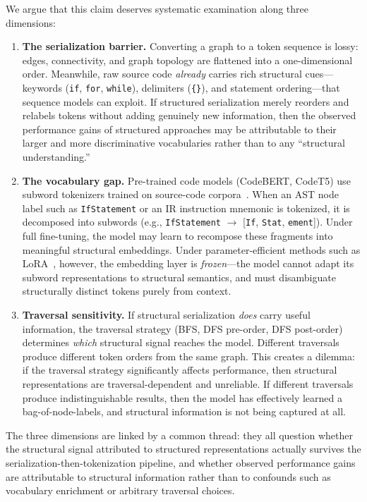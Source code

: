 \documentclass[pdflatex,sn-mathphys,Numbered]{sn-jnl}
\begin{document}
We argue that this claim deserves systematic examination along three dimensions:

\begin{enumerate}
\item \textbf{The serialization barrier.} Converting a graph to a token sequence is lossy: edges, connectivity, and graph topology are flattened into a one-dimensional order. Meanwhile, raw source code \emph{already} carries rich structural cues---keywords (\texttt{if}, \texttt{for}, \texttt{while}), delimiters (\texttt{\{\}}), and statement ordering---that sequence models can exploit. If structured serialization merely reorders and relabels tokens without adding genuinely new information, then the observed performance gains of structured approaches may be attributable to their larger and more discriminative vocabularies rather than to any ``structural understanding.''

\item \textbf{The vocabulary gap.} Pre-trained code models (CodeBERT, CodeT5) use subword tokenizers trained on source-code corpora~\citep{feng2020codebert,wang2021codet5}. When an AST node label such as \texttt{IfStatement} or an IR instruction mnemonic is tokenized, it is decomposed into subwords (e.g., \texttt{IfStatement} $\to$ [\texttt{If}, \texttt{Stat}, \texttt{ement}]). Under full fine-tuning, the model may learn to recompose these fragments into meaningful structural embeddings. Under parameter-efficient methods such as LoRA~\citep{hu2022lora}, however, the embedding layer is \emph{frozen}---the model cannot adapt its subword representations to structural semantics, and must disambiguate structurally distinct tokens purely from context.

\item \textbf{Traversal sensitivity.} If structural serialization \emph{does} carry useful information, the traversal strategy (BFS, DFS pre-order, DFS post-order) determines \emph{which} structural signal reaches the model. Different traversals produce different token orders from the same graph. This creates a dilemma: if the traversal strategy significantly affects performance, then structural representations are traversal-dependent and unreliable. If different traversals produce indistinguishable results, then the model has effectively learned a bag-of-node-labels, and structural information is not being captured at all.
\end{enumerate}

The three dimensions are linked by a common thread: they all question whether the structural signal attributed to structured representations actually survives the serialization-then-tokenization pipeline, and whether observed performance gains are attributable to structural information rather than to confounds such as vocabulary enrichment or arbitrary traversal choices.
\end{document}
